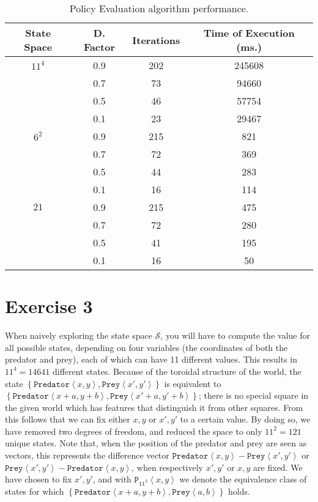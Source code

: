 \documentclass[a4paper,11pt]{article}
\newcommand{\Pred}[2]{\ensuremath{\mathtt{Predator}\left<#1, #2\right>}}
\newcommand{\Prey}[2]{\ensuremath{\mathtt{Prey}\left<#1, #2\right>}}
\newcommand{\p}[2]{\ensuremath{\mathtt{P_{11^2}}\left<#1, #2\right>}}
\begin{document}
\begin{table}[h!]
\caption{Policy Evaluation algorithm performance.}
\label{peap}
\begin{center}
\begin{tabular}{c@{ }@{ }c@{ }@{ }c@{ }@{ }c}
\textbf{State Space} & \textbf{D. Factor} & \textbf{Iterations} & \textbf{Time of Execution (ms.)} \\
\midrule
$11^{4}$    & 0.9         & 202         & 245608 \\
        & 0.7         & 73        & 94660    \\
        & 0.5         & 46        & 57754    \\
        & 0.1         & 23        & 29467  \\
$6^{2}$     & 0.9         & 215         & 821    \\
        & 0.7         & 72        & 369  \\
        & 0.5         & 44        & 283    \\
        & 0.1         & 16        & 114    \\
$21$      & 0.9         & 215         & 475  \\
        & 0.7         & 72        & 280  \\
        & 0.5         & 41        & 195  \\
        & 0.1         & 16        & 50  \\
\end{tabular}
\end{center}
\end{table}


\section*{Exercise 3}
When naively exploring the state space $\mathcal{S}$, you will have to compute the value for all possible states, depending on four variables (the coordinates of both the predator and prey), each of which can have 11 different values.  This results in $11^4 = 14641$ different states.  Because of the toroidal structure of the world, the state $\left\{\Pred{x}{y}, \Prey{x'}{y'}\right\}$ is equivalent to $\left\{\Pred{x+a}{y+b}, \Prey{x'+a}{y'+b}\right\}$; there is no special square in the given world which has features that distinguish it from other squares.  From this follows that we can fix either $x, y$ or $x', y'$ to a certain value.  By doing so, we have removed two degrees of freedom, and reduced the space to only $11^2 = 121$ unique states.  Note that, when the position of the predator and prey are seen as vectors, this represents the difference vector $\Pred{x}{y} - \Prey{x'}{y'}$ or $\Prey{x'}{y'} - \Pred{x}{y}$, when respectively $x', y'$ or $x, y$ are fixed.  We have chosen to fix $x', y'$, and with $\p{x}{y}$ we denote the equivalence class of states for which $\left\{\Pred{x+a}{y+b}, \Prey{a}{b}\right\}$ holds.
\end{document}
